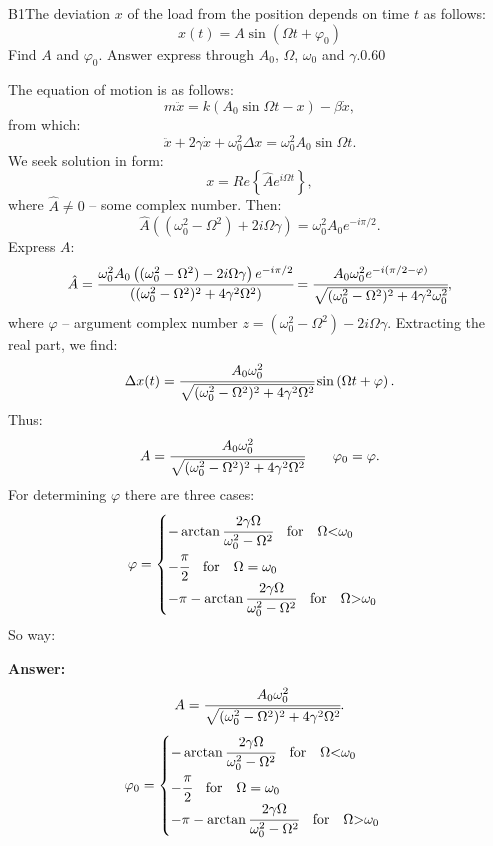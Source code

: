 \documentclass[11pt,a4paper]{article}
\begin{document}
\begin{solcard}{B1}{The deviation $x$ of the load from the position depends on time $t$ as follows: $$x(t)=A\sin\left(\Omega t+\varphi_0\right) $$Find $A$ and $\varphi_0$. Answer express through $A_0$, $\Omega$, $\omega_0$ and $\gamma$.}{0.60}

The equation of motion is as follows: $$m\ddot{x}=k(A_0\sin\Omega t-x)-\beta\dot{x}{,} $$from which: $$\ddot{x}+2\gamma\dot{x}+\omega^2_0\Delta{x}=\omega^2_0A_0\sin\Omega t{.} $$We seek solution in form: $$x=Re\left\{\hat{A}e^{i\Omega t}\right\}{,} $$where $\hat{A}\neq 0$ – some complex number. Then: $$\hat{A}\left((\omega^2_0-\Omega^2)+2i\Omega\gamma\right)=\omega^2_0A_0e^{-i\pi/2}{.} $$Express $A$: $$\hat{A}=\cfrac{\omega^2_0A_0\left((\omega^2_0-\Omega^2)-2i\Omega\gamma\right)e^{-i\pi/2}}{\left((\omega^2_0-\Omega^2)^2+4\gamma^2\Omega^2\right)}=\cfrac{A_0\omega^2_0e^{-i(\pi/2-\varphi)}}{\sqrt{(\omega^2_0-\Omega^2)^2+4\gamma^2\omega^2_0}}{,} $$where $\varphi$ – argument complex number $z=(\omega^2_0-\Omega^2) -2i\Omega\gamma$. Extracting the real part, we find: $$\Delta{x}(t)=\cfrac{A_0\omega^2_0}{\sqrt{(\omega^2_0-\Omega^2)^2+4\gamma^2\Omega^2}}\sin\left(\Omega t+\varphi\right){.} $$Thus: $$A=\cfrac{A_0\omega^2_0}{\sqrt{(\omega^2_0-\Omega^2)^2+4\gamma^2\Omega^2}}\qquad \varphi_0=\varphi{.} $$For determining $\varphi$ there are three cases: $$\varphi=\begin{cases} -\arctan\cfrac{2\gamma\Omega}{\omega^2_0-\Omega^2}\quad\text{for}\quad \Omega{<}\omega_0\\ -\cfrac{\pi}{2}\quad\text{for}\quad \Omega=\omega_0\\ -\pi-\arctan\cfrac{2\gamma\Omega}{\omega^2_0-\Omega^2}\quad\text{for}\quad \Omega{>}\omega_0 \end{cases} $$So way:

\par\smallskip\noindent\textbf{Answer:} $$A=\cfrac{A_0\omega^2_0}{\sqrt{(\omega^2_0-\Omega^2)^2+4\gamma^2\Omega^2}}{.} $$$$\varphi_0=\begin{cases} -\arctan\cfrac{2\gamma\Omega}{\omega^2_0-\Omega^2}\quad\text{for}\quad \Omega{<}\omega_0\\ -\cfrac{\pi}{2}\quad\text{for}\quad \Omega=\omega_0\\ -\pi-\arctan\cfrac{2\gamma\Omega}{\omega^2_0-\Omega^2}\quad\text{for}\quad \Omega{>}\omega_0 \end{cases} $$
\end{solcard}
\end{document}
